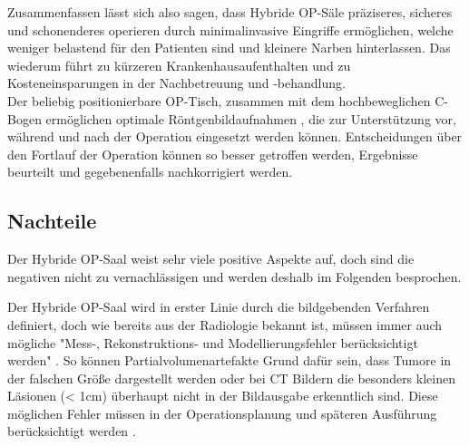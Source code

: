 

Zusammenfassen lässt sich also sagen, dass Hybride OP-Säle präziseres, sicheres und schonenderes operieren \cite{DresdnerUniklinikum} durch minimalinvasive Eingriffe ermöglichen, welche weniger belastend für den Patienten sind und kleinere Narben hinterlassen. Das wiederum  führt zu kürzeren Krankenhausaufenthalten und zu Kosteneinsparungen in der Nachbetreuung und -behandlung. \\
Der beliebig positionierbare OP-Tisch, zusammen mit dem hochbeweglichen C-Bogen  ermöglichen optimale Röntgenbildaufnahmen \cite{DresdnerUniklinikum}, die zur Unterstützung vor, während und nach der Operation eingesetzt werden können. Entscheidungen über den Fortlauf der Operation können so besser getroffen werden, Ergebnisse beurteilt und gegebenenfalls nachkorrigiert werden.

%
%



\subsection{Nachteile}

Der Hybride OP-Saal weist sehr viele positive Aspekte auf, doch sind die negativen nicht zu vernachlässigen und werden deshalb im Folgenden besprochen.

Der Hybride OP-Saal wird in erster Linie durch die bildgebenden Verfahren definiert, doch wie bereits aus der Radiologie bekannt ist, müssen immer auch mögliche "Mess-, Rekonstruktions- und Modellierungsfehler berücksichtigt werden" \cite{DerDigitaleOperationssaal}. 
So können Partialvolumenartefakte Grund dafür sein, dass Tumore in der falschen Größe dargestellt werden oder bei CT Bildern die besonders kleinen Läsionen (< 1cm) überhaupt nicht in der Bildausgabe erkenntlich sind. Diese möglichen Fehler müssen in der Operationsplanung und späteren Ausführung berücksichtigt werden \cite{DerDigitaleOperationssaal}.

